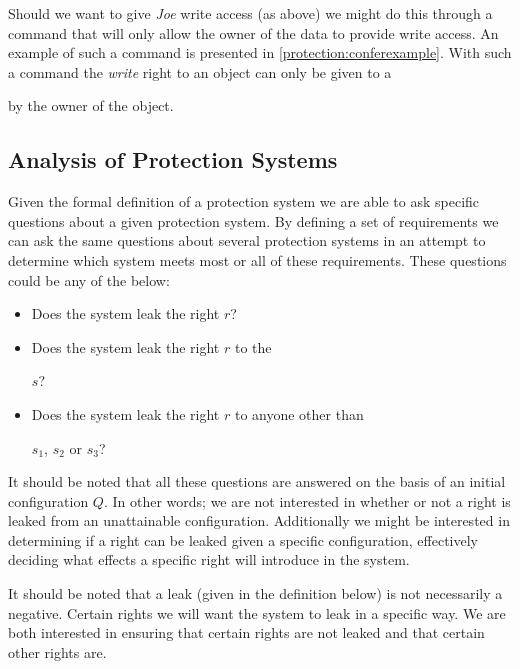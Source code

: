 Should we want to give \textit{Joe} write access (as above) we might do this through a command that will only allow the owner of the data to provide write access.
An example of such a command is presented in \cref{protection:conferexample}.
With such a command the \textit{write} right to an object can only be given to a \subject{} by the owner of the object.


\subsection{Analysis of Protection Systems}
Given the formal definition of a protection system we are able to ask specific questions about a given protection system.
By defining a set of requirements we can ask the same questions about several protection systems in an attempt to determine which system meets most or all of these requirements.
These questions could be any of the below:
\begin{itemize}
\item Does the system leak the right $r$?
\item Does the system leak the right $r$ to the \subject{} $s$?
\item Does the system leak the right $r$ to anyone other than \subject{} $s_1$, $s_2$ or $s_3$?
\end{itemize}
It should be noted that all these questions are answered on the basis of an initial configuration $Q$.
In other words; we are not interested in whether or not a right is leaked from an unattainable configuration.
Additionally we might be interested in determining if a right can be leaked given a specific configuration, effectively deciding what effects a specific right will introduce in the system.

It should be noted that a leak (given in the definition below) is not necessarily a negative.
Certain rights we will want the system to leak in a specific way.
We are both interested in ensuring that certain rights are not leaked and that certain other rights are.

